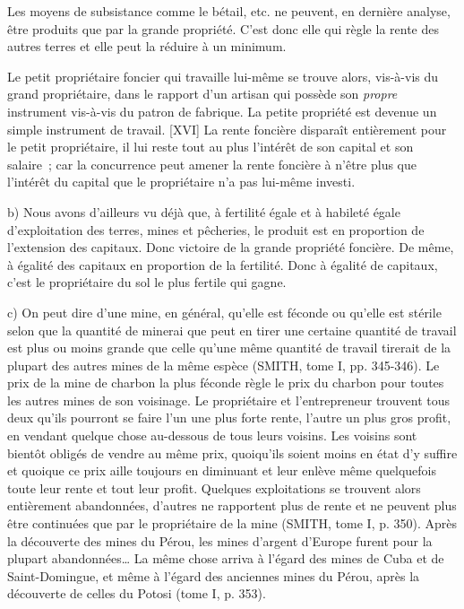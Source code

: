 \documentclass[french,twoside]{book} %
\newenvironment{quoteblock}%
  {\begin{quoting}}
  {\end{quoting}}
\newenvironment{quotebar}{%
    \def\FrameCommand{{\color{rubric!10!}\vrule width 0.5em} \hspace{0.9em}}%
    \def\OuterFrameSep{\itemsep} %
    \MakeFramed {\advance\hsize-\width \FrameRestore}
  }%
  {%
    \endMakeFramed
  }
\renewenvironment{quoteblock}%
  {%
    \savenotes
    \setstretch{0.9}
    \normalfont
    \begin{quotebar}
  }
  {%
    \end{quotebar}
    \spewnotes
  }
\begin{document}
\noindent Les moyens de subsistance comme le bétail, etc. ne peuvent, en dernière analyse, être produits que par la grande propriété. C’est donc elle qui règle la rente des autres terres et elle peut la réduire à un minimum.\par
Le petit propriétaire foncier qui travaille lui-même se trouve alors, vis-à-vis du grand propriétaire, dans le rapport d’un artisan qui possède son \emph{propre} instrument vis-à-vis du patron de fabrique. La petite propriété est devenue un simple instrument de travail. [XVI] La rente foncière disparaît entièrement pour le petit propriétaire, il lui reste tout au plus l’intérêt de son capital et son salaire ; car la concurrence peut amener la rente foncière à n’être plus que l’intérêt du capital que le propriétaire n’a pas lui-même investi.\par
b) Nous avons d’ailleurs vu déjà que, à fertilité égale et à habileté égale d’exploitation des terres, mines et pêcheries, le produit est en proportion de l’extension des capitaux. Donc victoire de la grande propriété foncière. De même, à égalité des capitaux en proportion de la fertilité. Donc à égalité de capitaux, c’est le propriétaire du sol le plus fertile qui gagne.\par

\begin{quoteblock}
 \noindent c) On peut dire d’une mine, en général, qu’elle est féconde ou qu’elle est stérile selon que la quantité de minerai que peut en tirer une certaine quantité de travail est plus ou moins grande que celle qu’une même quantité de travail tirerait de la plupart des autres mines de la même espèce (SMITH, tome I, pp. 345-346). Le prix de la mine de charbon la plus féconde règle le prix du charbon pour toutes les autres mines de son voisinage. Le propriétaire et l’entrepreneur trouvent tous deux qu’ils pourront se faire l’un une plus forte rente, l’autre un plus gros profit, en vendant quelque chose au-dessous de tous leurs voisins. Les voisins sont bientôt obligés de vendre au même prix, quoiqu’ils soient moins en état d’y suffire et quoique ce prix aille toujours en diminuant et leur enlève même quelquefois toute leur rente et tout leur profit. Quelques exploitations se trouvent alors entièrement abandonnées, d’autres ne rapportent plus de rente et ne peuvent plus être continuées que par le propriétaire de la mine (SMITH, tome I, p. 350). Après la découverte des mines du Pérou, les mines d’argent d’Europe furent pour la plupart abandonnées… La même chose arriva à l’égard des mines de Cuba et de Saint-Domingue, et même à l’égard des anciennes mines du Pérou, après la découverte de celles du Potosi (tome I, p. 353).
 \end{quoteblock}
\end{document}
